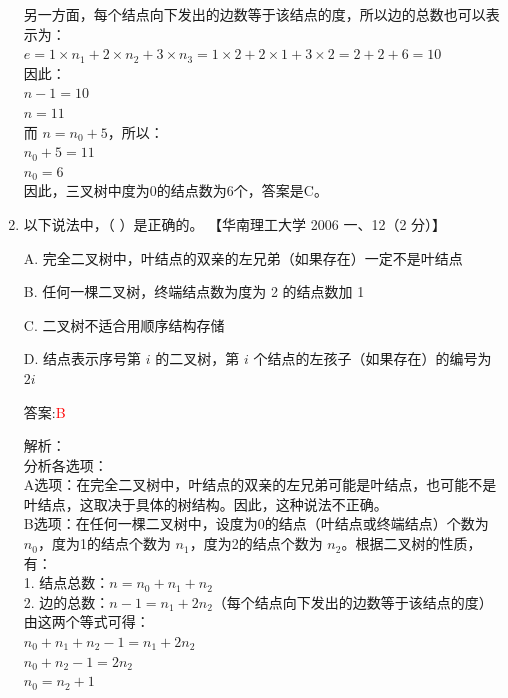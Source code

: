 \documentclass[lang=cn,newtx,10pt,scheme=chinese]{../../../elegantbook}
\begin{document}
\begin{enumerate}
    另一方面，每个结点向下发出的边数等于该结点的度，所以边的总数也可以表示为：\\
    $e = 1 \times n_1 + 2 \times n_2 + 3 \times n_3 = 1 \times 2 + 2 \times 1 + 3 \times 2 = 2 + 2 + 6 = 10$\\
    
    因此：\\
    $n - 1 = 10$\\
    $n = 11$\\
    
    而 $n = n_0 + 5$，所以：\\
    $n_0 + 5 = 11$\\
    $n_0 = 6$\\
    
    因此，三叉树中度为0的结点数为6个，答案是C。\\  

    \item 以下说法中，（ ）是正确的。  
    【华南理工大学 2006 一、12（2 分）】  

    A. 完全二叉树中，叶结点的双亲的左兄弟（如果存在）一定不是叶结点  

    B. 任何一棵二叉树，终端结点数为度为 2 的结点数加 1 

    C. 二叉树不适合用顺序结构存储  

    D. 结点表示序号第 $i$ 的二叉树，第 $i$ 个结点的左孩子（如果存在）的编号为 $2i$  
    
    答案:\textcolor{red}{B}
    
    解析：\\
    分析各选项：\\
    A选项：在完全二叉树中，叶结点的双亲的左兄弟可能是叶结点，也可能不是叶结点，这取决于具体的树结构。因此，这种说法不正确。\\
    
    B选项：在任何一棵二叉树中，设度为0的结点（叶结点或终端结点）个数为 $n_0$，度为1的结点个数为 $n_1$，度为2的结点个数为 $n_2$。根据二叉树的性质，有：\\
    1. 结点总数：$n = n_0 + n_1 + n_2$\\
    2. 边的总数：$n - 1 = n_1 + 2n_2$（每个结点向下发出的边数等于该结点的度）\\
    
    由这两个等式可得：\\
    $n_0 + n_1 + n_2 - 1 = n_1 + 2n_2$\\
    $n_0 + n_2 - 1 = 2n_2$\\
    $n_0 = n_2 + 1$\\
    

\end{enumerate}
\end{document}
